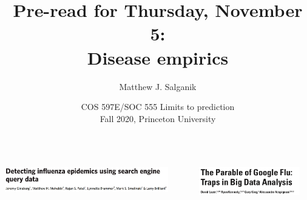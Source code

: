 \documentclass[aspectratio=169]{beamer}
\title[]{Pre-read for Thursday, November 5:\\Disease empirics}
\author[]{Matthew J. Salganik}
\institute[]{}
\date[]{COS 597E/SOC 555 Limits to prediction\\Fall 2020, Princeton University}
\begin{document}
\frame{\titlepage}
\begin{frame}

\begin{columns}[c]
  \begin{center}
  \includegraphics[width = 0.9\textwidth]{figures/ginsberg_detecting_2009_title}
  \end{center}
   \begin{center}
  \includegraphics[width = 0.9\textwidth]{figures/lazer_parable_2014_title}
  \end{center}
\end{columns}

\end{frame}
\end{document}
